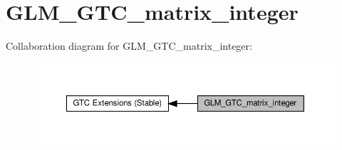 \hypertarget{group__gtc__matrix__integer}{}\section{G\+L\+M\+\_\+\+G\+T\+C\+\_\+matrix\+\_\+integer}
\label{group__gtc__matrix__integer}
Collaboration diagram for G\+L\+M\+\_\+\+G\+T\+C\+\_\+matrix\+\_\+integer\+:\nopagebreak
\begin{figure}[H]
\begin{center}
\leavevmode
\includegraphics[width=350pt]{group__gtc__matrix__integer}
\end{center}
\end{figure}
